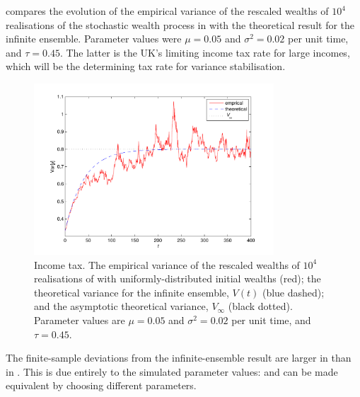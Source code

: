  compares the evolution of the empirical variance of the rescaled wealths of $10^4$ realisations of the stochastic wealth process in  with the theoretical result for the infinite ensemble. Parameter values were $\mu=0.05$ and $\sigma^2=0.02$ per unit time, and $\tau=0.45$. The latter is the UK's limiting income tax rate for large incomes, which will be the determining tax rate for variance stabilisation.
\begin{figure}
\bc
\includegraphics[width=0.8\textwidth]{./chapter_3/figs/var_income.pdf}
\caption{Income tax. The empirical variance of the rescaled wealths of $10^4$ realisations of  with uniformly-distributed initial wealths (red); the theoretical variance for the infinite ensemble, $V(t)$ (blue dashed); and the asymptotic theoretical variance, $V_\infty$ (black dotted). Parameter values are $\mu=0.05$ and $\sigma^2=0.02$ per unit time, and $\tau=0.45$.}
\ec
\end{figure}

The finite-sample deviations from the infinite-ensemble result are larger in  
than in . This is due entirely to the simulated parameter values:  
and  can be made equivalent by choosing different parameters. 

